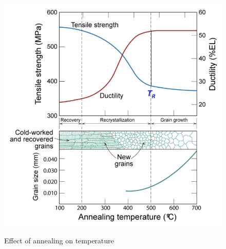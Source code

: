 \begin{figure} [ht]
  \centering
  \caption{Effect of annealing on temperature}
  \includegraphics[width=0.45\linewidth]{./figures/f8_7.png}
  \label{fig:f8_7}
\end{figure}

